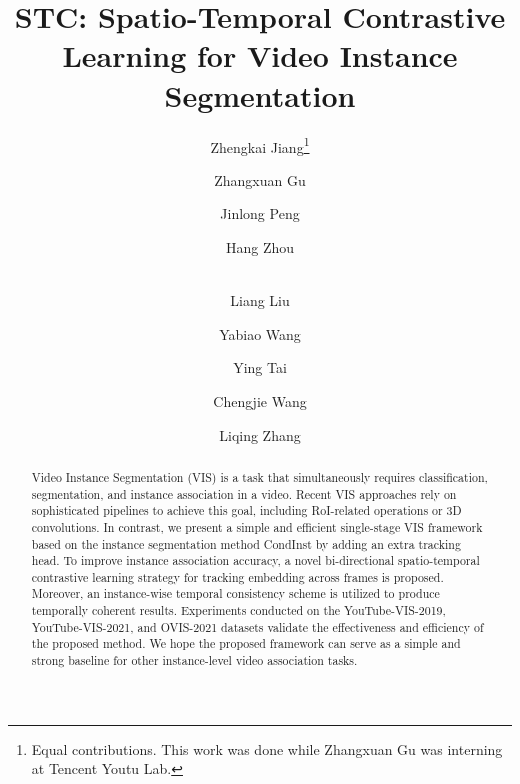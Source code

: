 \documentclass[runningheads]{llncs}
\begin{document}
\pagestyle{headings}
\mainmatter
\def\ECCVSubNumber{3}  

\title{STC: Spatio-Temporal Contrastive Learning for Video Instance Segmentation} 

\begin{comment}
\titlerunning{ECCV-22 submission ID \ECCVSubNumber} 
\authorrunning{ECCV-22 submission ID \ECCVSubNumber} 
\author{Anonymous ECCV submission}
\institute{Paper ID \ECCVSubNumber}
\end{comment}




\author{Zhengkai Jiang\thanks{Equal contributions. This work was done while Zhangxuan Gu was interning at Tencent Youtu Lab.} \and 
Zhangxuan Gu \and Jinlong Peng \and
Hang Zhou \and \\ Liang Liu \and Yabiao Wang \and Ying Tai  \and Chengjie Wang \and Liqing Zhang}
\maketitle

\begin{abstract}
Video Instance Segmentation (VIS) is a task that simultaneously requires classification, segmentation, and instance association in a video. Recent VIS approaches rely on sophisticated pipelines to achieve this goal, including RoI-related operations or 3D convolutions. In contrast, we present a simple and efficient single-stage VIS framework based on the instance segmentation method CondInst by adding an extra tracking head. To improve instance association accuracy, a novel bi-directional spatio-temporal contrastive learning strategy for tracking embedding across frames is proposed. Moreover, an instance-wise temporal consistency scheme is utilized to produce temporally coherent results. Experiments conducted on the YouTube-VIS-2019, YouTube-VIS-2021, and OVIS-2021 datasets validate the effectiveness and efficiency of the proposed method. We hope the proposed framework can serve as a simple and strong baseline for other instance-level video association tasks.
\end{abstract}
\end{document}
